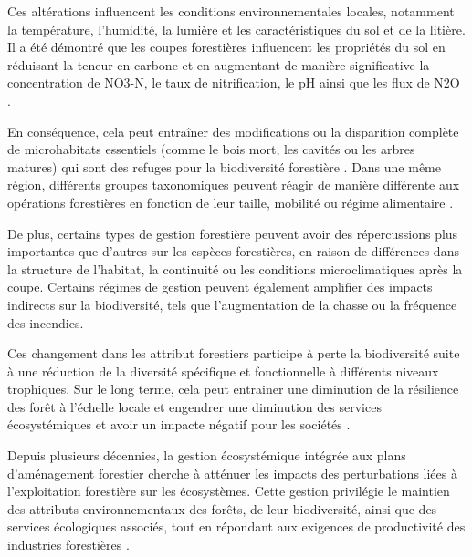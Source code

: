 Ces altérations influencent les conditions environnementales locales, notamment la température, l'humidité, la lumière et les caractéristiques du sol et de la litière. 
Il a été démontré que les coupes forestières influencent les propriétés du sol en réduisant la teneur en carbone et en augmentant de manière significative la concentration de NO3-N, le taux de nitrification, le pH ainsi que les flux de N2O \citep{Jerabkova2011metaanalysiseffects,Michal2014Responsessmall,James2016effectharvest,Zhang2022Intensiveforest}.

En conséquence, cela peut entraîner des modifications ou la disparition complète de microhabitats essentiels (comme le bois mort, les cavités ou les arbres matures) qui sont des refuges pour la biodiversité forestière \citep{Paillet2010Biodiversitydifferences}. 
Dans une même région, différents groupes taxonomiques peuvent réagir de manière différente aux opérations forestières en fonction de leur taille, mobilité ou régime alimentaire \citep{Barlow2007Quantifyingbiodiversity,Stork2009Vulnerabilityresilience}.

De plus, certains types de gestion forestière peuvent avoir des répercussions plus importantes que d'autres sur les espèces forestières, en raison de différences dans la structure de l'habitat, la continuité ou les conditions microclimatiques après la coupe. 
Certains régimes de gestion peuvent également amplifier des impacts indirects sur la biodiversité, tels que l'augmentation de la chasse ou la fréquence des incendies.



Ces changement dans les attribut forestiers participe à perte la biodiversité suite à une réduction de la diversité spécifique et fonctionnelle à différents niveaux trophiques.
Sur le long terme, cela peut entrainer une diminution de la résilience des forêt à l'échelle locale et engendrer une diminution des services écosystémiques et avoir un impacte négatif pour les sociétés \citep{Hooper2012globalsynthesis,Edwards2014Maintainingecosystem}.


Depuis plusieurs décennies, la gestion écosystémique intégrée aux plans d’aménagement forestier cherche à atténuer les impacts des perturbations liées à l’exploitation forestière sur les écosystèmes.
Cette gestion privilégie le maintien des attributs environnementaux des forêts, de leur biodiversité, ainsi que des services écologiques associés, tout en répondant aux exigences de productivité des industries forestières \citep{Perry1998scientificbasis,Szaro1998emergenceecosystem,Kuuluvainen2009Forestmanagement,MacDicken2015Globalprogress}.


